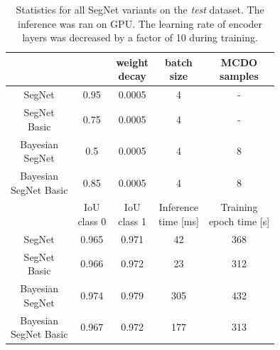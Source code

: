\renewcommand{\arraystretch}{1.1}
\begin{table}[h]
	\centering	
	\begin{tabular}{|c|c|c|c|c|}
		\hline
		\thead{Architecture} & \thead{base\_lr} & \thead{weight \\ decay} & \thead{batch \\ size} & \thead{MCDO \\ samples}\\		
		\hline
		SegNet & 0.95 & 0.0005 & 4 & - \\
		\hline
		\makecell{SegNet \\ Basic} & 0.75 & 0.0005 & 4 & - \\
		\hline
		\makecell{Bayesian \\ SegNet} & 0.5 & 0.0005 & 4 & 8 \\	
		\hline
		\makecell{Bayesian \\ SegNet Basic} & 0.85 & 0.0005 & 4 & 8 \\
		\hline
		& \thead{IoU \\ class 0} & \thead{IoU \\ class 1} & \thead{Inference \\ time [ms] } & \thead{Training \\ epoch time [s] }\\		
		\hline	
		SegNet & 0.965 & 0.971 & 42 & 368 \\	
		\hline	
		\makecell{SegNet \\ Basic} & 0.966 & 0.972 & 23 & 312 \\	
		\hline	
		\makecell{Bayesian \\ SegNet} & 0.974 & 0.979 & 305 & 432 \\	
		\hline	
		\makecell{Bayesian \\ SegNet Basic} & 0.967 & 0.972 & 177 & 313 \\
		\hline
	\end{tabular}
	\vspace{10mm}
	\caption{Statistics for all SegNet variants on the \textit{test} dataset. The inference was ran on GPU. The learning rate of encoder layers was decreased by a factor of 10 during training.} 
	\label{tabulka}
\end{table}

